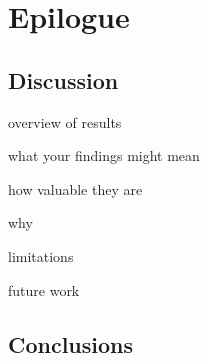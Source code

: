 \chapter{Epilogue}

\section{Discussion}
overview of results

what your findings might mean

how valuable they are

why

limitations

future work

\section{Conclusions}

